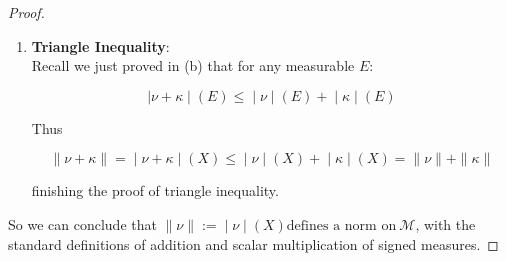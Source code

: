 \documentclass{qlnotes-export}
\begin{document}
\begin{proof}
\begin{enumerate}
  We have:

  \[\left. \parallel a\nu \parallel = \middle| a\nu \middle| (X) = \middle| a \middle| \cdot \middle| \nu \middle| (X) = \middle| a \middle| \cdot \parallel \nu \parallel \right.\]

  finishing the proof of absolute homogeneity.
\item
  \textbf{Triangle Inequality}:\\
  Recall we just proved in (b) that for any measurable \(E\):

  \[\left. |\nu + \kappa \middle| (E) \leq \middle| \nu \middle| (E) + \middle| \kappa \middle| (E) \right.\]

  Thus

  \[\left. \parallel \nu + \kappa \parallel = \middle| \nu + \kappa \middle| (X) \leq \middle| \nu \middle| (X) + \middle| \kappa \middle| (X) = \parallel \nu \parallel + \parallel \kappa \parallel \right.\]

  finishing the proof of triangle inequality.\\
\end{enumerate}

So we can conclude that \(\left. \parallel \nu \parallel := \middle| \nu \middle| (X)\text{defines a norm on}\ \mathcal{M} \right.\), with the standard definitions of addition and scalar multiplication of signed measures.

\end{proof}
\end{document}
